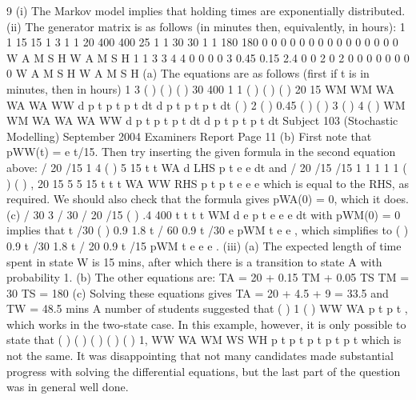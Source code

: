 9 (i) The Markov model implies that holding times are exponentially distributed.
(ii) The generator matrix is as follows (in minutes then, equivalently, in hours):
1 1
15 15
1 3 1 1
20 400 400 25
1 1
30 30
1 1
180 180
0 0 0
0
0 0 0
0 0 0
0 0 0 0 0
W A M S H
W
A
M
S
H
1 1
3 3
4 4 0 0 0
0 3 0.45 0.15 2.4
0 0 2 0 2
0 0 0
0 0 0 0 0
W A M S H
W
A
M
S
H
(a) The equations are as follows (first if t is in minutes, then in hours)
1 3
( ) ( ) ( )
30 400
1 1
( ) ( ) ( )
20 15
WM WM WA
WA WA WW
d
p t p t p t
dt
d
p t p t p t
dt
( ) 2 ( ) 0.45 ( )
( ) 3 ( ) 4 ( )
WM WM WA
WA WA WW
d
p t p t p t
dt
d
p t p t p t
dt
Subject 103 (Stochastic Modelling) September 2004 Examiners Report
Page 11
(b) First note that pWW(t) = e t/15. Then try inserting the given formula in
the second equation above:
/ 20 /15 1 4
( )
5 15
t t
WA
d
LHS p t e e
dt
and
/ 20 /15 /15 1 1 1 1 1
( ) ( ) ,
20 15 5 5 15
t t t
WA WW RHS p t p t e e e
which is equal to the RHS, as required.
We should also check that the formula gives pWA(0) = 0, which it does.
(c) / 30 3 / 30 / 20 /15
( ) .4
400
t t t t
WM
d
e p t e e e
dt
with pWM(0) = 0
implies that t /30 ( ) 0.9 1.8 t / 60 0.9 t /30
e pWM t e e , which simplifies
to ( ) 0.9 t /30 1.8 t / 20 0.9 t /15
pWM t e e e .
(iii) (a) The expected length of time spent in state W is 15 mins, after which
there is a transition to state A with probability 1.
(b) The other equations are:
TA = 20 + 0.15 TM + 0.05 TS
TM = 30
TS = 180
(c) Solving these equations gives TA = 20 + 4.5 + 9 = 33.5 and TW = 48.5
mins
A number of students suggested that ( ) 1 ( ) WW WA p t p t , which works in the
two-state case. In this example, however, it is only possible to state that
( ) ( ) ( ) ( ) ( ) 1, WW WA WM WS WH p t p t p t p t p t which is not the same.
It was disappointing that not many candidates made substantial progress with
solving the differential equations, but the last part of the question was in
general well done.


